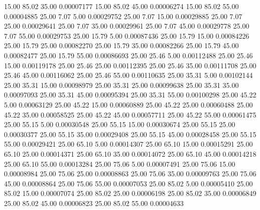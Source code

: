      15.00     85.02     35.00     0.00007177
     15.00     85.02     45.00     0.00006274
     15.00     85.02     55.00     0.00004885
     25.00      7.07      5.00     0.00029752
     25.00      7.07     15.00     0.00029885
     25.00      7.07     25.00     0.00029641
     25.00      7.07     35.00     0.00029961
     25.00      7.07     45.00     0.00029778
     25.00      7.07     55.00     0.00029753
     25.00     15.79      5.00     0.00087436
     25.00     15.79     15.00     0.00084226
     25.00     15.79     25.00     0.00082270
     25.00     15.79     35.00     0.00082266
     25.00     15.79     45.00     0.00082477
     25.00     15.79     55.00     0.00086693
     25.00     25.46      5.00     0.00112488
     25.00     25.46     15.00     0.00119178
     25.00     25.46     25.00     0.00112395
     25.00     25.46     35.00     0.00111708
     25.00     25.46     45.00     0.00116062
     25.00     25.46     55.00     0.00110635
     25.00     35.31      5.00     0.00102144
     25.00     35.31     15.00     0.00098979
     25.00     35.31     25.00     0.00099638
     25.00     35.31     35.00     0.00097093
     25.00     35.31     45.00     0.00095394
     25.00     35.31     55.00     0.00100298
     25.00     45.22      5.00     0.00063129
     25.00     45.22     15.00     0.00060889
     25.00     45.22     25.00     0.00060488
     25.00     45.22     35.00     0.00058525
     25.00     45.22     45.00     0.00057711
     25.00     45.22     55.00     0.00061475
     25.00     55.15      5.00     0.00030548
     25.00     55.15     15.00     0.00030674
     25.00     55.15     25.00     0.00030377
     25.00     55.15     35.00     0.00029408
     25.00     55.15     45.00     0.00028458
     25.00     55.15     55.00     0.00029421
     25.00     65.10      5.00     0.00014307
     25.00     65.10     15.00     0.00015291
     25.00     65.10     25.00     0.00014371
     25.00     65.10     35.00     0.00014072
     25.00     65.10     45.00     0.00014218
     25.00     65.10     55.00     0.00013284
     25.00     75.06      5.00     0.00007491
     25.00     75.06     15.00     0.00008984
     25.00     75.06     25.00     0.00008863
     25.00     75.06     35.00     0.00009763
     25.00     75.06     45.00     0.00008864
     25.00     75.06     55.00     0.00007053
     25.00     85.02      5.00     0.00005410
     25.00     85.02     15.00     0.00007074
     25.00     85.02     25.00     0.00006198
     25.00     85.02     35.00     0.00006849
     25.00     85.02     45.00     0.00006823
     25.00     85.02     55.00     0.00004633
